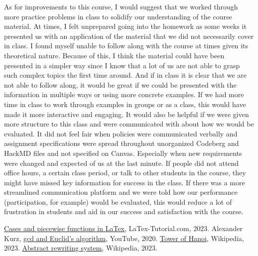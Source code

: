 \documentclass{article}
\theoremstyle{theorem}
\theoremstyle{definition}
\theoremstyle{remark}
\begin{document}
As for improvements to this course, I would suggest that we worked through more practice problems in class to solidify our understanding of the course material. At times, I felt unprepared going into the homework as some weeks it presented us with an application of the material that we did not necessarily cover in class. I found myself unable to follow along with the course at times given its theoretical nature. Because of this, I think the material could have been presented in a simpler way since I know that a lot of us are not able to grasp such complex topics the first time around. And if in class it is clear that we are not able to follow along, it would be great if we could be presented with the information in multiple ways or using more concrete examples. If we had more time in class to work through examples in groups or as a class, this would have made it more interactive and engaging. It would also be helpful if we were given more structure to this class and were communicated with about how we would be evaluated. It did not feel fair when policies were communicated verbally and assignment specifications were spread throughout unorganized Codeberg and HackMD files and not specified on Canvas. Especially when new requirements were changed and expected of us at the last minute. If people did not attend office hours, a certain class period, or talk to other students in the course, they might have missed key information for success in the class. If there was a more streamlined communication platform and we were told how our performance (participation, for example) would be evaluated, this would reduce a lot of frustration in students and aid in our success and satisfaction with the course.

\begin{thebibliography}{99}
 \href{https://latex-tutorial.com/piecewise-functions-latex/}{Cases and piecewise functions in LaTex}, LaTex-Tutorial.com, 2023.
 Alexander Kurz, \href{https://www.youtube.com/watch?v=ZcJMj0antos}{gcd and Euclid's algorithm}, YouTube, 2020.
 \href{https://en.wikipedia.org/wiki/Tower_of_Hanoi}{Tower of Hanoi}, Wikipedia, 2023.
\href{https://en.wikipedia.org/wiki/Abstract_rewriting_system#:~:text=In%20a%20convergent%20ARS%2C%20every,if%20it%20is%20locally%20confluent.}{Abstract rewriting system}, Wikipedia, 2023.
\end{thebibliography}
\end{document}

